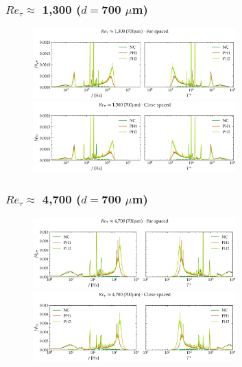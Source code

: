 \documentclass[aspectratio=169,9pt]{beamer}
\begin{document}
\begin{frame}
  \frametitle{$Re_\tau\approx$ 1,300 ($d=$700 $\mu$m)}
  \begin{figure}
    \centering
    \includegraphics[width=0.7\textwidth]{raw_spectra/700_atm_raw_spec_far.png}
    \includegraphics[width=0.7\textwidth]{raw_spectra/700_atm_raw_spec_close.png}
  \end{figure}
\end{frame}

\begin{frame}
  \frametitle{$Re_\tau \approx$ 4,700 ($d=$700 $\mu$m)}
  \begin{figure}
    \centering
    \includegraphics[width=0.7\textwidth]{raw_spectra/700_50psi_raw_spec_far.png}
    \includegraphics[width=0.7\textwidth]{raw_spectra/700_50psi_raw_spec_close.png}
  \end{figure}
\end{frame}
\end{document}
